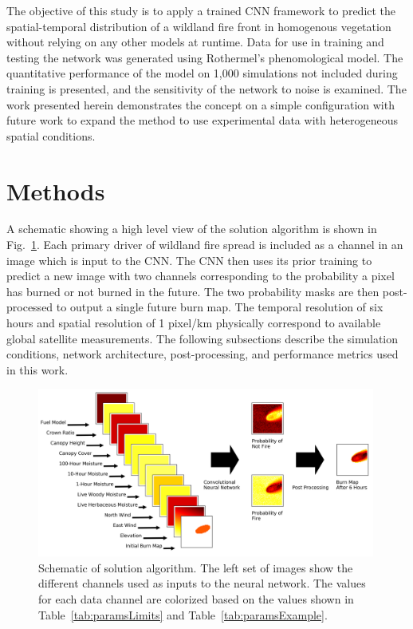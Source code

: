 \documentclass[smallcondensed]{svjour3}     %
\begin{document}
The objective of this study is to apply a trained CNN framework to predict the
spatial-temporal distribution of a wildland fire front in homogenous vegetation
without relying on any other models at runtime. Data for use in
training and testing the network was generated using Rothermel's phenomological
model. The quantitative performance of the model on 1,000 simulations not included
during training is presented, and
the sensitivity of the network to noise is examined.
The work presented herein demonstrates the concept
on a simple configuration with future work to expand the method to use
experimental data with heterogeneous spatial conditions.

\section{Methods}
\label{s:Methods}

A schematic showing a high level view of the solution algorithm is shown
in Fig.~\ref{fig:exampleIO}.
Each primary driver of wildland fire spread is included as a channel in an
image which is input to the CNN.
The CNN then uses its prior training to predict a new image with two channels
corresponding to the probability a pixel has burned or not burned in the future.
The two probability masks are then post-processed to output a single future
burn map. The temporal resolution of six hours and spatial resolution of 1 pixel/km
physically correspond to available global satellite measurements.
The following subsections describe the simulation conditions, network architecture,
post-processing, and performance metrics used in this work.

\begin{figure}[htb]
  \includegraphics[width=0.99\textwidth]{inputsExampleSingleFire.png}
\caption{Schematic of solution algorithm. The left set of images show the
different channels used as inputs to the neural network. The values for each
data channel are colorized based on the values shown in
Table~\ref{tab:paramsLimits} and Table~\ref{tab:paramsExample}.}
\label{fig:exampleIO}       %
\end{figure}
\end{document}
